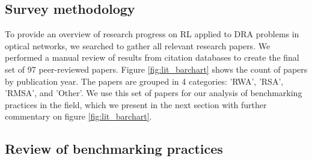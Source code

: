 \subsection{Survey methodology}
\label{sec:survey-methodology}


To provide an overview of research progress on RL applied to DRA problems in optical networks, we searched to gather all relevant research papers. We performed a manual review of results from citation databases to create the final set of 97 peer-reviewed papers. Figure \ref{fig:lit_barchart} shows the count of papers by publication year. The papers are grouped in 4 categories: 'RWA', 'RSA', 'RMSA', and 'Other'. We use this set of papers for our analysis of benchmarking practices in the field, which we present in the next section with further commentary on figure \ref{fig:lit_barchart}. 



\subsection{Review of benchmarking practices}
\label{sec:benchmarking_practices}


